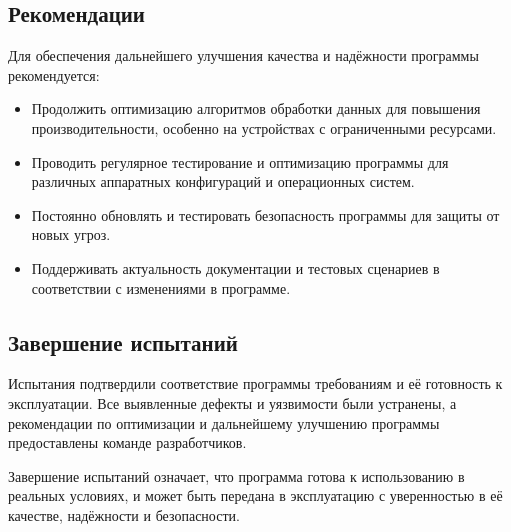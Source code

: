 \documentclass{article}
\begin{document}
\begin{itemize}
    \subsection{Рекомендации}

    Для обеспечения дальнейшего улучшения качества и надёжности программы рекомендуется:

    \begin{itemize}
        \item Продолжить оптимизацию алгоритмов обработки данных для повышения производительности, особенно на устройствах с ограниченными ресурсами.
        \item Проводить регулярное тестирование и оптимизацию программы для различных аппаратных конфигураций и операционных систем.
        \item Постоянно обновлять и тестировать безопасность программы для защиты от новых угроз.
        \item Поддерживать актуальность документации и тестовых сценариев в соответствии с изменениями в программе.
    \end{itemize}

    \subsection{Завершение испытаний}

    Испытания подтвердили соответствие программы требованиям и её готовность к эксплуатации. Все выявленные дефекты и уязвимости были устранены, а рекомендации по оптимизации и дальнейшему улучшению программы предоставлены команде разработчиков.

    Завершение испытаний означает, что программа готова к использованию в реальных условиях, и может быть передана в эксплуатацию с уверенностью в её качестве, надёжности и безопасности.
    \newpage


\end{itemize}
\end{document}
